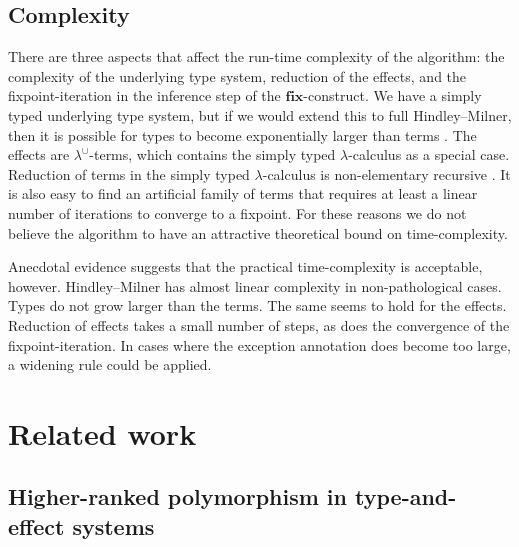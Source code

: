 \documentclass{llncs}
\newcommand{\LambdaUnion}{\lambda^\cup}
\begin{document}
\subsection{Complexity}
There are three aspects that affect the run-time complexity of the algorithm: the complexity of the underlying type system, reduction of the effects, and the fixpoint-iteration in the inference step of the $\mathbf{fix}$-construct.
We have a simply typed underlying type system, but if we would extend this to full Hindley--Milner, then it is possible for types to become exponentially larger than terms \cite{Mairson:1989:DMT:96709.96748,Kfoury:1990:MTD:101856.101870}. The effects are $\LambdaUnion$-terms, which contains the simply typed $\lambda$-calculus as a special case. Reduction of terms in the simply typed $\lambda$-calculus is non-elementary recursive \cite{stat79b}. It is also easy to find an artificial family of terms that requires at least a linear number of iterations to converge to a fixpoint. For these reasons we do not believe the algorithm to have an attractive theoretical bound on time-complexity.

Anecdotal evidence suggests that the practical time-complexity is acceptable, however. Hindley--Milner has almost linear complexity in non-pathological cases. Types do not grow larger than the terms. The same seems to hold for the effects. Reduction of effects takes a small number of steps, as does the convergence of the fixpoint-iteration.
In cases where the exception annotation does become too large, a widening rule could be applied.

\section{Related work}\label{section-related-work}

\subsection{Higher-ranked polymorphism in type-and-effect systems}
\end{document}
